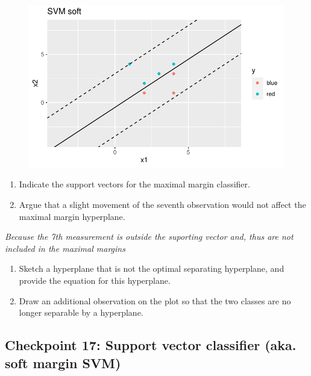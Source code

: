 \documentclass[
  letterpaper,
  DIV=11,
  numbers=noendperiod]{scrartcl}
\begin{document}
\begin{figure}[H]

{\centering \includegraphics{excercise_doc_files/figure-pdf/unnamed-chunk-25-1.pdf}

}

\end{figure}

\begin{enumerate}
\def\labelenumi{(\alph{enumi})}
\setcounter{enumi}{4}
\item
  Indicate the support vectors for the maximal margin classifier.
\item
  Argue that a slight movement of the seventh observation would not
  affect the maximal margin hyperplane.
\end{enumerate}

\emph{Because the 7th measurement is outside the suporting vector and,
thus are not included in the maximal margins}

\begin{enumerate}
\def\labelenumi{(\alph{enumi})}
\setcounter{enumi}{6}
\item
  Sketch a hyperplane that is not the optimal separating hyperplane, and
  provide the equation for this hyperplane.
\item
  Draw an additional observation on the plot so that the two classes are
  no longer separable by a hyperplane.
\end{enumerate}

\hypertarget{checkpoint-17-support-vector-classifier-aka.-soft-margin-svm}{%
\subsection{Checkpoint 17: Support vector classifier (aka. soft margin
SVM)}\label{checkpoint-17-support-vector-classifier-aka.-soft-margin-svm}}
\end{document}
